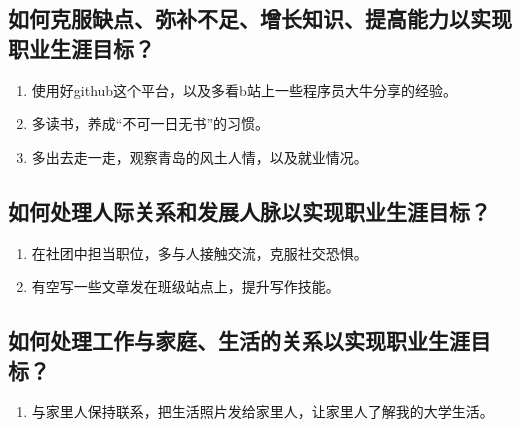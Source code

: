 \documentclass{article}
\begin{document}
  \subsection{如何克服缺点、弥补不足、增长知识、提高能力以实现职业生涯目标？}
 \begin{enumerate}
 	\item 使用好github这个平台，以及多看b站上一些程序员大牛分享的经验。
 	\item 多读书，养成“不可一日无书”的习惯。
 	\item 多出去走一走，观察青岛的风土人情，以及就业情况。
 	\end{enumerate}
  \subsection{如何处理人际关系和发展人脉以实现职业生涯目标？}
 \begin{enumerate}
\item 在社团中担当职位，多与人接触交流，克服社交恐惧。
\item 有空写一些文章发在班级站点上，提升写作技能。
 \end{enumerate}
  \subsection{如何处理工作与家庭、生活的关系以实现职业生涯目标？}
 \begin{enumerate}
\item 与家里人保持联系，把生活照片发给家里人，让家里人了解我的大学生活。
 \end{enumerate}
\end{document}
